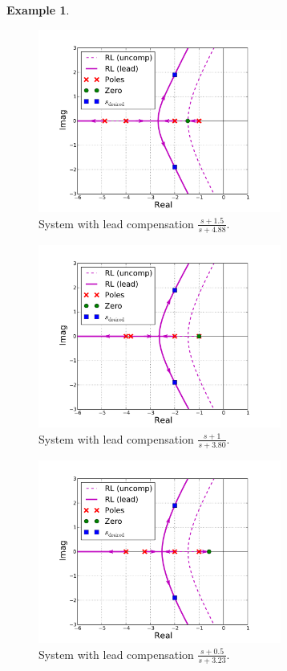 \documentclass[a4paper,11pt]{report}
\theoremstyle{definition}
\newtheorem{mdexample}{Example}
\newenvironment{example}%
  {\vspace{0.1cm}\begin{mdframed}[backgroundcolor=lightgray]\begin{mdexample}}%
  {\end{mdexample}\end{mdframed}\vspace{0.1cm}}
\begin{document}
\begin{example}
  \begin{figure}[H]
    \centering
    \includegraphics[width=8cm]{fig/design-lead15.pdf}
    \caption{System with lead compensation $\frac{s+1.5}{s+4.88}$.}
    \label{fig:design-lead15}
  \end{figure}
  \begin{figure}[H]
    \centering
    \includegraphics[width=8cm]{fig/design-lead10.pdf}
    \caption{System with lead compensation $\frac{s+1}{s+3.80}$.}
    \label{fig:design-lead10}
  \end{figure}

  \begin{figure}[H]
    \centering
    \includegraphics[width=8cm]{fig/design-lead05.pdf}
    \caption{System with lead compensation $\frac{s+0.5}{s+3.23}$.}
    \label{fig:design-lead05}
  \end{figure}


\end{example}
\end{document}

